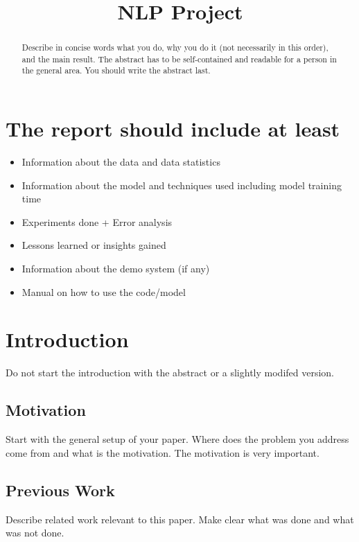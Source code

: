 \documentclass{article}
\title{NLP Project}
\begin{document}
%
\maketitle
%
\begin{abstract}
Describe in concise words what you do, why you do it (not necessarily
in this order), and the main result.  The abstract has to be
self-contained and readable for a person in the general area. You
should write the abstract last.
\end{abstract}

\section{The report should include at least} \label{sec:we_must_do}
    \begin{itemize}
  \item  Information about the data and data statistics
  \item Information about the model and techniques used including model training time
  \item  Experiments done + Error analysis
  \item Lessons learned or insights gained
  \item  Information about the demo system (if any)
  \item Manual on how to use the code/model
\end{itemize}

\section{Introduction}\label{sec:intro}

Do not start the introduction with the abstract or a slightly modifed
version.

\subsection{Motivation}

Start with the general setup of your paper. Where does the problem you
address come from and what is the motivation. The motivation is very
important.
\subsection{Previous Work}

Describe related work relevant to this paper. Make clear what was
done and what was not done. \cite{ma2018query} \cite{sennrich2016edinburgh}
\end{document}
